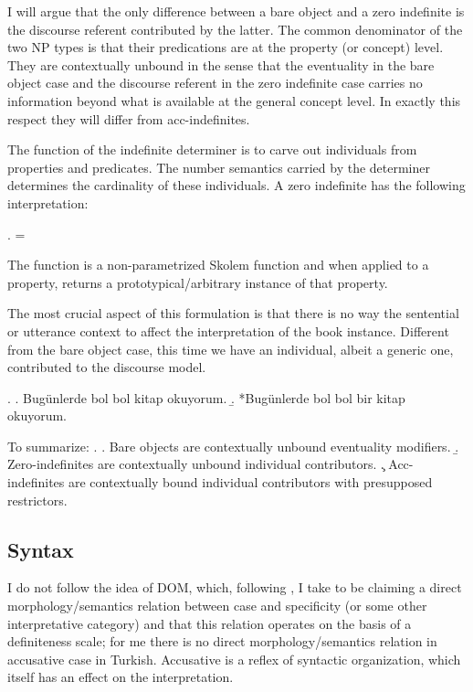 \documentclass[11pt,a4paper]{article}
\begin{document}
I will argue that the only difference between a bare object and a zero indefinite is the discourse referent contributed by the latter. The common denominator of the two NP types is that their predications are at the property (or concept) level. They are contextually unbound in the sense that the eventuality in the bare object case and the discourse referent in the zero indefinite case carries no information beyond what is available at the general concept level. In exactly this respect they will differ from acc-indefinites.


The function of the indefinite determiner is to carve out individuals from properties and predicates. The number semantics carried by the determiner determines the cardinality of these individuals. A zero indefinite has the following interpretation:

\ex.
 =

The function  is a non-parametrized Skolem function and when applied to a property, returns a prototypical/arbitrary instance of that property.

The most crucial aspect of this formulation is that there is no way the sentential or utterance context to affect the interpretation of the book instance. Different from the bare object case, this time we have an individual, albeit a generic one, contributed to the discourse model.

\ex.
\a. Bugünlerde bol bol kitap okuyorum.
\b. *Bugünlerde bol bol bir kitap okuyorum.



To summarize:
\ex.
\a. Bare objects are contextually unbound eventuality modifiers.
\b. Zero-indefinites are contextually unbound individual contributors.
\c. Acc-indefinites are contextually bound individual contributors with presupposed restrictors.


\subsection{Syntax}

I do not follow the idea of DOM, which, following \cite{lopez12}, I take to be claiming a direct morphology/semantics relation between case and specificity (or some other interpretative category) and that this relation operates on the basis of a definiteness scale; for me there is no direct morphology/semantics relation in accusative case in Turkish. Accusative is a reflex of syntactic organization, which itself has an effect on the interpretation.
\end{document}
